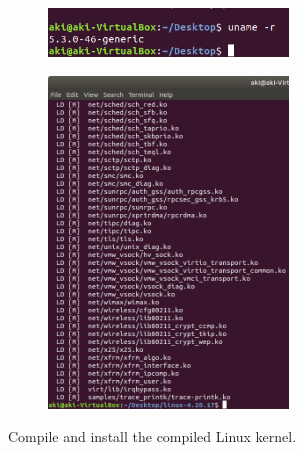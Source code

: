 \documentclass[11pt,letterpaper,titlepage]{article}
\begin{document}
\begin{figure}[ht]
    \centering
    \begin{subfigure}[b]{0.49\textwidth}
    \includegraphics[width=0.7\textwidth]{1.compiling environment.png}
    \end{subfigure}
    \begin{subfigure}[b]{0.49\textwidth}
    \includegraphics[width=0.7\textwidth]{2.compiling result.png}
    \end{subfigure}
    \caption{Compile and install the compiled Linux kernel.}
\end{figure}
\end{document}
